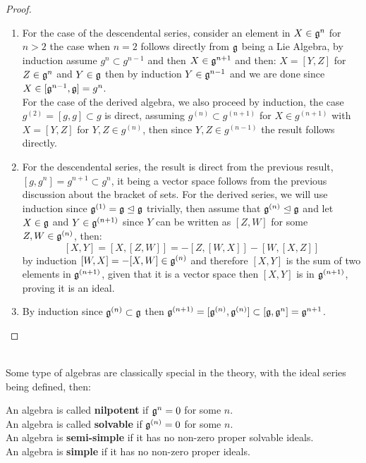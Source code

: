 \begin{proof}
	\begin{enumerate}[label=(\alph*)]
		\item For the case of the descendental series, consider an element in $X \in \mathfrak{g}^n$ for $n > 2$ the case when $n=2$ follows directly from $\mathfrak{g}$ being a Lie Algebra, by induction assume $g^{n}\subset g^{n-1}$ and then $X \in \mathfrak{g}^{n+1}$ and then: $X=[Y,Z]$ for $Z \in \mathfrak{g}^{n}$ and $Y \in \mathfrak{g}$ then by induction $Y\in \mathfrak{g}^{n-1}$ and we are done since $X \in [\mathfrak{g}^{n-1},\mathfrak{g}] = g^{n}$.\\
		For the case of the derived algebra, we also proceed by induction, the case $g^{(2)} = [g,g] \subset g$ is direct, assuming $g^{(n)} \subset g^{(n+1)}$ for $X \in g^{(n+1)}$ with $X=[Y,Z]$ for $Y,Z \in g^{(n)}$, then since $Y,Z \in g^{(n-1)}$ the result follows directly.\\
	\item For the descendental series, the result is direct from the previous result, $[g,g^n] = g^{n+1} \subset g^n$, it being a vector space follows from the previous discussion about the bracket of sets. For the derived series, we will use induction since $\mathfrak{g}^{(1)}=\mathfrak{g} \trianglelefteq \mathfrak{g}$ trivially, then assume that $\mathfrak{g}^{(n)} \trianglelefteq \mathfrak{g}$ and let $X \in \mathfrak{g}$ and $Y \in \mathfrak{g}^{(n+1)}$ since $Y$ can be written as $[Z,W]$ for some $Z,W \in \mathfrak{g}^{(n)}$, then:
	$$[X,Y] = [X,[Z,W]] = -[Z,[W,X]]-[W,[X,Z]] $$ 
	by induction $[W,X] = -[X,W] \in \mathfrak{g}^{(n)}$ and therefore $[X,Y]$ is the sum of two elements in $\mathfrak{g}^{(n+1)}$, given that it is a vector space then $[X,Y]$ is in $\mathfrak{g}^{(n+1)}$, proving it is an ideal.
	\item By induction since $\mathfrak{g}^{(n)}\subset \mathfrak{g}$ then $\mathfrak{g}^{(n+1)} = [\mathfrak{g}^{(n)},\mathfrak{g}^{(n)}] \subset [\mathfrak{g},\mathfrak{g}^n] = \mathfrak{g}^{n+1}$.
	\end{enumerate}
\end{proof}\\
Some type of algebras are classically special in the theory, with the ideal series being defined, then:
\begin{defi}

 An algebra is called \textbf{nilpotent} if $\mathfrak{g}^n = 0$ for some $n$.\\
 An algebra is called \textbf{solvable} if $\mathfrak{g}^{(n)}=0$ for some $n$.\\
 An algebra is \textbf{semi-simple} if it has no non-zero proper solvable ideals.\\
 An algebra is \textbf{simple} if it has no non-zero proper ideals.

\label{algebratypes}
\end{defi}
